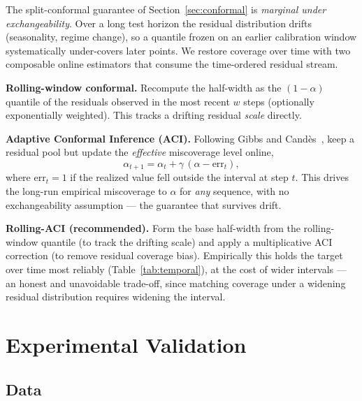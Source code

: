 \documentclass[journal]{IEEEtran}
\begin{document}
The split-conformal guarantee of Section~\ref{sec:conformal} is \emph{marginal under
exchangeability}. Over a long test horizon the residual distribution drifts (seasonality, regime
change), so a quantile frozen on an earlier calibration window systematically under-covers later
points. We restore coverage over time with two composable online estimators that consume the
time-ordered residual stream.

\textbf{Rolling-window conformal.} Recompute the half-width as the $(1-\alpha)$ quantile of the
residuals observed in the most recent $w$ steps (optionally exponentially weighted). This tracks a
drifting residual \emph{scale} directly.

\textbf{Adaptive Conformal Inference (ACI).} Following Gibbs and Cand\`es~\cite{gibbs2021aci}, keep a
residual pool but update the \emph{effective} miscoverage level online,
\begin{equation}
\alpha_{t+1} = \alpha_t + \gamma\,(\alpha - \mathrm{err}_t),
\end{equation}
where $\mathrm{err}_t = 1$ if the realized value fell outside the interval at step $t$. This drives
the long-run empirical miscoverage to $\alpha$ for \emph{any} sequence, with no exchangeability
assumption --- the guarantee that survives drift.

\textbf{Rolling-ACI (recommended).} Form the base half-width from the rolling-window quantile (to
track the drifting scale) and apply a multiplicative ACI correction (to remove residual coverage
bias). Empirically this holds the target over time most reliably (Table~\ref{tab:temporal}), at the
cost of wider intervals --- an honest and unavoidable trade-off, since matching coverage under a
widening residual distribution requires widening the interval.

\section{Experimental Validation}
\label{sec:experiments}

\subsection{Data}
\end{document}

